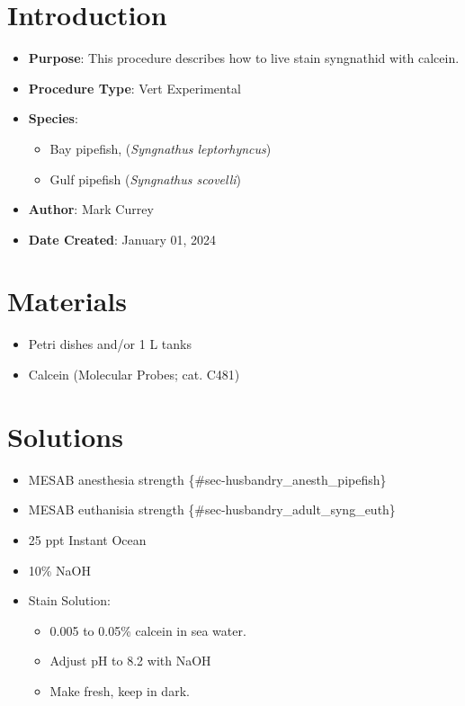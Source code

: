 \documentclass[
  letterpaper,
  DIV=11,
  numbers=noendperiod]{scrreprt}
\providecommand{\tightlist}{%
  \setlength{\itemsep}{0pt}\setlength{\parskip}{0pt}}\usepackage{longtable,booktabs,array}
\begin{document}
\hypertarget{introduction-87}{%
\section{Introduction}\label{introduction-87}}

\begin{itemize}
\tightlist
\item
  \textbf{Purpose}: This procedure describes how to live stain
  syngnathid with calcein.
\item
  \textbf{Procedure Type}: Vert Experimental
\item
  \textbf{Species}:

  \begin{itemize}
  \tightlist
  \item
    Bay pipefish, (\emph{Syngnathus leptorhyncus})
  \item
    Gulf pipefish (\emph{Syngnathus scovelli})
  \end{itemize}
\item
  \textbf{Author}: Mark Currey
\item
  \textbf{Date Created}: January 01, 2024
\end{itemize}

\hypertarget{materials-82}{%
\section{Materials}\label{materials-82}}

\begin{itemize}
\tightlist
\item
  Petri dishes and/or 1 L tanks
\item
  Calcein (Molecular Probes; cat. C481)
\end{itemize}

\hypertarget{solutions-74}{%
\section{Solutions}\label{solutions-74}}

\begin{itemize}
\tightlist
\item
  MESAB anesthesia strength \{\#sec-husbandry\_anesth\_pipefish\}
\item
  MESAB euthanisia strength \{\#sec-husbandry\_adult\_syng\_euth\}
\item
  25 ppt Instant Ocean
\item
  10\% NaOH
\item
  Stain Solution:

  \begin{itemize}
  \tightlist
  \item
    0.005 to 0.05\% calcein in sea water.
  \item
    Adjust pH to 8.2 with NaOH
  \item
    Make fresh, keep in dark.
  \end{itemize}
\end{itemize}
\end{document}
